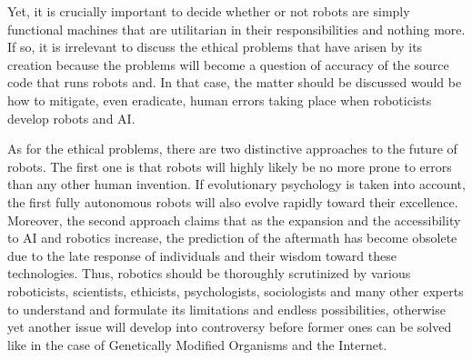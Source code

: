 \documentclass[man]{apa6}
\begin{document}
Yet, it is crucially important to decide whether or not robots are simply functional machines that are utilitarian in their responsibilities and nothing more.
If so, it is irrelevant to discuss the ethical problems that have arisen by its creation because the problems will become a question of accuracy of the source code that runs robots and.
In that case, the matter should be discussed would be how to mitigate, even eradicate, human errors taking place when roboticists develop robots and AI. \par
As for the ethical problems, there are two distinctive approaches to the future of robots. The first one is that robots will highly likely be no more prone to errors than any other human invention.
If evolutionary psychology is taken into account, the first fully autonomous robots will also evolve rapidly toward their excellence.
Moreover, the second approach claims that as the expansion and the accessibility to AI and robotics increase, the prediction of the aftermath has become obsolete due to the late response of individuals and their wisdom toward these technologies.
Thus, robotics should be thoroughly scrutinized by various roboticists, scientists, ethicists, psychologists, sociologists and many other experts to understand and formulate its limitations and endless possibilities, otherwise yet another issue will develop into controversy before former ones can be solved like in the case of Genetically Modified Organisms and the Internet.  


\end{document}
